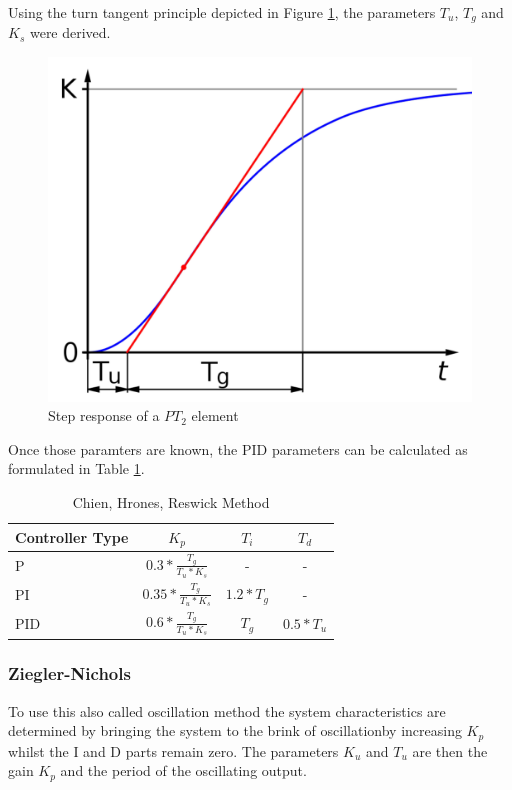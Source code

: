 Using the turn tangent principle depicted in Figure \ref{fig:wendetangentenverfahren}, the parameters $T_u$, $T_g$ and $K_s$ were derived.

\begin{figure}[H]
\begin{center}
\includegraphics[width=0.6\linewidth]{images/general/wendetangentenverfahren}
\end{center}
\caption{Step response of a $PT_2$ element}
\label{fig:wendetangentenverfahren}
\end{figure}

Once those paramters are known, the PID parameters can be calculated as formulated in Table \ref{tab:chien}.

\begin{table}[H]
\begin{center}
\begin{tabular}{ l | c | c | c}
  Controller Type & $K_p$ & $T_i$ & $T_d$\\
  \hline
  \hline
  P & $0.3 * \frac{T_g}{T_u * K_s}$& - & -\\
  \hline
  PI & $0.35 * \frac{T_g}{T_u * K_s}$ & $1.2 * T_g$ & - \\
  \hline
  PID & $0.6 * \frac{T_g}{T_u * K_s}$ & $T_g$ & $0.5 * T_u$\\
  \hline
\end{tabular}
\end{center}
\caption{Chien, Hrones, Reswick Method}
\label{tab:chien}
\end{table}

\subsubsection{Ziegler-Nichols}
\label{subs:Ziegler-Nichols}

To use this also called oscillation method the system characteristics are determined by bringing the system to the brink of oscillationby increasing $K_p$ whilst the I and D parts remain zero. The parameters $K_u$ and $T_u$ are then the gain $K_p$ and the period of the oscillating output.

